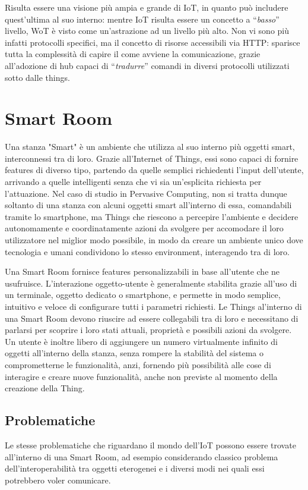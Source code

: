 \documentclass[12pt,a4paper,openright,oneside]{report}
\newcommand{\quotes}[1]{``#1''}
\begin{document}
Risulta essere una visione più ampia e grande di IoT, in quanto può includere quest'ultima al suo interno: mentre IoT risulta essere un concetto a \quotes{\textit{basso}} livello, WoT è visto come un'astrazione ad un livello più alto. Non vi sono più infatti protocolli specifici, ma il concetto di risorse accessibili via HTTP: sparisce tutta la complessità di capire il come avviene la comunicazione, grazie all'adozione di hub capaci di \quotes{\textit{tradurre}} comandi in diversi protocolli utilizzati sotto dalle things.


\section{Smart Room}
Una stanza "Smart" \cite{smartroom} è un ambiente che utilizza al suo interno più oggetti smart, interconnessi tra di loro. Grazie all'Internet of Things, essi sono capaci di fornire features di diverso tipo, partendo da quelle semplici richiedenti l'input dell'utente, arrivando a quelle intelligenti senza che vi sia un'esplicita richiesta per l'attuazione. Nel caso di studio in Pervasive Computing, non si tratta dunque soltanto di una stanza con alcuni oggetti smart all'interno di essa, comandabili tramite lo smartphone, ma Things che riescono a percepire l'ambiente e decidere autonomamente e coordinatamente azioni da svolgere per accomodare il loro utilizzatore nel miglior modo possibile, in modo da creare un ambiente unico dove tecnologia e umani condividono lo stesso environment, interagendo tra di loro.

Una Smart Room fornisce features personalizzabili in base all'utente che ne usufruisce. L'interazione oggetto-utente è generalmente stabilita grazie all'uso di un terminale, oggetto dedicato o smartphone, e permette in modo semplice, intuitivo e veloce di configurare tutti i parametri richiesti. Le Things al'interno di una Smart Room devono riuscire ad essere collegabili tra di loro e necessitano di parlarsi per scoprire i loro stati attuali, proprietà e possibili azioni da svolgere. Un utente è inoltre libero di aggiungere un numero virtualmente infinito di oggetti all'interno della stanza, senza rompere la stabilità del sistema o comprometterne le funzionalità, anzi, fornendo più possibilità alle cose di interagire e creare nuove funzionalità, anche non previste al momento della creazione della Thing.

\subsection{Problematiche}
Le stesse problematiche che riguardano il mondo dell'IoT possono essere trovate all'interno di una Smart Room, ad esempio considerando classico problema dell'interoperabilità tra oggetti eterogenei e i diversi modi nei quali essi potrebbero voler comunicare.\\
\end{document}
